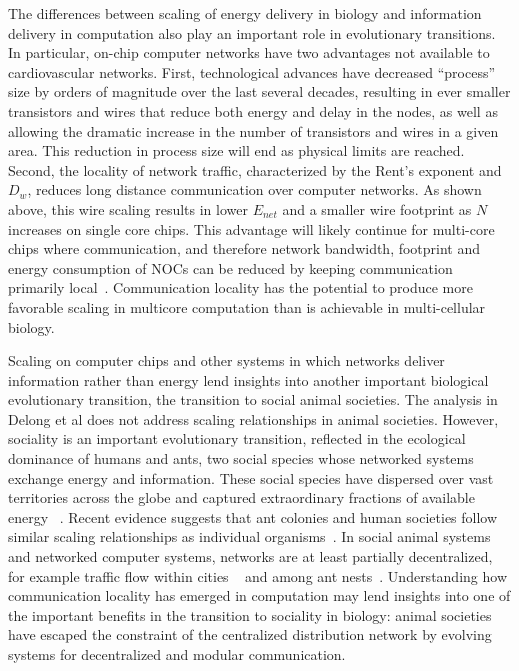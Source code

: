 \documentclass[12pt]{article}
\begin{document}
  
The differences between scaling of energy delivery in biology and information
delivery in computation also play an important role in evolutionary
transitions. In particular, on-chip computer networks have two advantages not
available to cardiovascular networks. First, technological advances have decreased
``process'' size by orders of magnitude over the last several decades,
resulting in ever smaller transistors and wires that reduce both energy and
delay in the nodes, as well as allowing the dramatic increase in the number of
transistors and wires in a given area. This reduction in process size will end
as physical limits are reached. Second, the locality of
network traffic, characterized by the Rent's exponent and $D_w$, reduces long
distance communication over computer networks. As shown above, this wire
scaling results in lower $E_{net}$ and a smaller wire footprint as $N$
increases on single core chips. This advantage will likely continue for
multi-core chips where communication, and therefore network bandwidth,
footprint and energy consumption of NOCs can be reduced by keeping
communication primarily local~\cite{bezerra2010modeling, zarkesh2010hybrid}. Communication locality
has the potential to produce more favorable scaling in multicore
computation than is achievable in multi-cellular biology.

Scaling on computer chips and other systems in which networks deliver
information rather than energy lend insights into another important
biological evolutionary transition, the transition to social animal societies.
The analysis in Delong et al does not address scaling relationships in animal societies.
However, sociality is an important evolutionary transition, reflected in the
ecological dominance of humans and ants, two social species whose networked
systems exchange energy and information. These social species have dispersed over vast territories across the globe and captured
extraordinary fractions of available energy ~\cite{haberl2007quantifying, holldobler1990ants}. Recent evidence suggests that ant colonies and
human societies follow similar scaling relationships as individual organisms~\cite{moses2003allometry, bettencourt2007growth, burnside2012human, hou2010energetic, waters2010allometric}. In social animal systems and networked computer systems, networks
are at least partially decentralized, for example traffic flow within cities ~\cite{samaniego2008cities} and among ant nests~\cite{flanagan2013fast}. Understanding
how communication locality has emerged in computation may lend insights into
one of the important benefits in the transition to sociality in biology: animal
societies have escaped the constraint of the centralized distribution network
by evolving systems for decentralized and modular communication.
\end{document}

